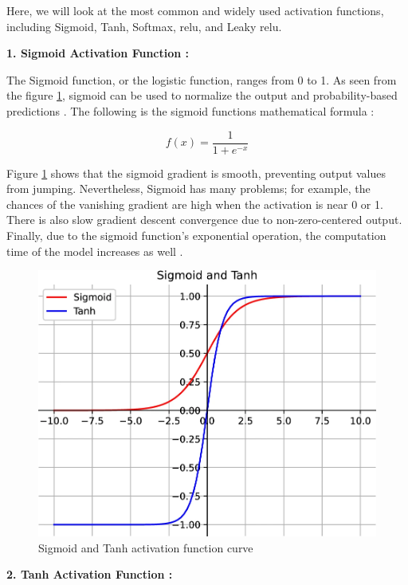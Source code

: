Here, we will look at the most common and widely used activation functions, including Sigmoid, Tanh, Softmax, \gls{relu}, and Leaky \gls{relu}.

\textbf{1. Sigmoid Activation Function :}

The Sigmoid function, or the logistic function, ranges from 0 to 1. As seen from the figure \ref{fig:sigmoid tanh function curve}, sigmoid can be used to normalize the output and probability-based predictions \cite{Zhao2024}. The following is the sigmoid functions mathematical formula :

\[ 
    f(x) = \frac{1}{1 + e^{-x}}
\]

Figure \ref{fig:sigmoid tanh function curve} shows that the sigmoid gradient is smooth, preventing output values from jumping. Nevertheless, Sigmoid has many problems; for example, the chances of the vanishing gradient are high when the activation is near 0 or 1. There is also slow gradient descent convergence due to non-zero-centered output. Finally, due to the sigmoid function's exponential operation, the computation time of the model increases as well \cite{Zhao2024}.


\begin{figure}[!ht]
    \centering
    \includegraphics[width=1\linewidth]{Rohit_Master_Thesis//Images/sigmoid_tanh_af.png}
    \caption{Sigmoid and Tanh activation function curve \cite{Zhao2024}}
    \label{fig:sigmoid tanh function curve}
\end{figure}

\textbf{2. Tanh Activation Function :}

